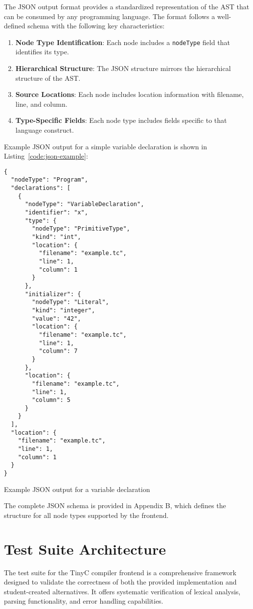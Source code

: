 The JSON output format provides a standardized representation of the AST that can be consumed by any programming language. The format follows a well-defined schema with the following key characteristics:

\begin{enumerate}
    \item \textbf{Node Type Identification}: Each node includes a \texttt{nodeType} field that identifies its type.
    \item \textbf{Hierarchical Structure}: The JSON structure mirrors the hierarchical structure of the AST.
    \item \textbf{Source Locations}: Each node includes location information with filename, line, and column.
    \item \textbf{Type-Specific Fields}: Each node type includes fields specific to that language construct.
\end{enumerate}

Example JSON output for a simple variable declaration is shown in Listing~\ref{code:json-example}:
\begin{listing}[h!]
\begin{verbatim}
{
  "nodeType": "Program",
  "declarations": [
    {
      "nodeType": "VariableDeclaration",
      "identifier": "x",
      "type": {
        "nodeType": "PrimitiveType",
        "kind": "int",
        "location": {
          "filename": "example.tc",
          "line": 1,
          "column": 1
        }
      },
      "initializer": {
        "nodeType": "Literal",
        "kind": "integer",
        "value": "42",
        "location": {
          "filename": "example.tc",
          "line": 1,
          "column": 7
        }
      },
      "location": {
        "filename": "example.tc",
        "line": 1,
        "column": 5
      }
    }
  ],
  "location": {
    "filename": "example.tc",
    "line": 1,
    "column": 1
  }
}
\end{verbatim}
\caption{Example JSON output for a variable declaration}
\label{code:json-example}
\end{listing}

The complete JSON schema is provided in Appendix B, which defines the structure for all node types supported by the frontend.

\pagebreak

\section{Test Suite Architecture}
The test suite for the TinyC compiler frontend is a comprehensive framework designed to validate the correctness of both the provided implementation and student-created alternatives. It offers systematic verification of lexical analysis, parsing functionality, and error handling capabilities.
